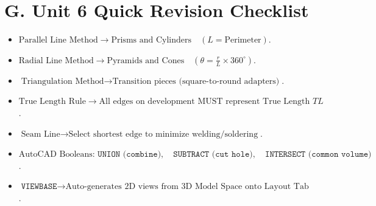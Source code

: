 \section{G. Unit 6 Quick Revision Checklist}
\begin{revisionchecklist}
\begin{itemize}
    \item $\text{Parallel Line Method} \to \text{Prisms and Cylinders} \quad (L = \text{Perimeter})$.
    \item $\text{Radial Line Method} \to \text{Pyramids and Cones} \quad \left(\theta = \frac{r}{L} \times 360^\circ\right)$.
    \item $\text{Triangulation Method} \to \text{Transition pieces (square-to-round adapters)}$.
    \item $\text{True Length Rule} \to \text{All edges on development MUST represent True Length } TL$.
    \item $\text{Seam Line} \to \text{Select shortest edge to minimize welding/soldering}$.
    \item $\text{AutoCAD Booleans: } \texttt{UNION (combine)}, \quad \texttt{SUBTRACT (cut hole)}, \quad \texttt{INTERSECT (common volume)}$.
    \item $\texttt{VIEWBASE} \to \text{Auto-generates 2D views from 3D Model Space onto Layout Tab}$.
\end{itemize}
\end{revisionchecklist}
